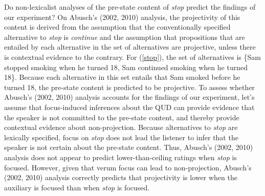 \documentclass[a4paper,12pt]{article}
\newcommand{\6}{\mbox{$[\hspace*{-.6mm}[$}}
\newcommand{\9}{\mbox{$]\hspace*{-.6mm}]$}}
\begin{document}
Do non-lexicalist analyses of the pre-state content of {\em stop} predict the findings of our experiment? On Abusch's (2002, 2010) analysis, the projectivity of this content is derived from the assumption that the conventionally specified alternative to {\em stop} is {\em continue} and the assumption that propositions that are entailed by each alternative in the set of alternatives are projective, unless there is contextual evidence to the contrary. For (\ref{stop}), the set of alternatives is \{Sam stopped smoking when he turned 18, Sam continued smoking when he turned 18\}. Because each alternative in this set entails that Sam smoked before he turned 18, the pre-state content is predicted to be projective. To assess whether Abusch's (2002, 2010) analysis accounts for the findings of our experiment, let's assume that focus-induced inferences about the QUD can provide evidence that the speaker is not committed to the pre-state content, and thereby provide contextual evidence about non-projection. Because alternatives to {\em stop} are lexically specified, focus on {\em stop} does not lead the listener to infer that the speaker is not certain about the pre-state content. Thus, Abusch's (2002, 2010) analysis does not appear to predict lower-than-ceiling ratings when {\em stop} is focused. However, given that verum focus can lead to non-projection, Abusch's (2002, 2010) analysis correctly predicts that projectivity is lower when the auxiliary is focused than when {\em stop} is focused.
\end{document}
